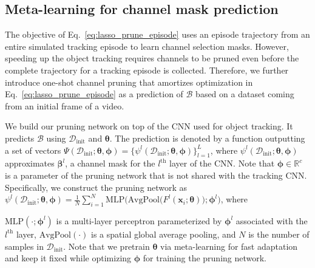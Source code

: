 \documentclass[letterpaper]{article} %
\def \x{\mathbf{x}}
\def \datainit{\mathcal{D}_\text{init}}
\def \phigeneral{\boldsymbol{\phi}}
\def \thetageneral{\boldsymbol{\theta}}
\begin{document}
\subsection{Meta-learning for channel mask prediction}

The objective of Eq.~\eqref{eq:lasso_prune_episode} uses an episode trajectory from an entire simulated tracking episode to learn channel selection masks.
However, speeding up the object tracking requires channels to be pruned even before the complete trajectory for a tracking episode is collected.
Therefore, we further introduce one-shot channel pruning that amortizes optimization in Eq.~\eqref{eq:lasso_prune_episode} as a prediction of $\mathcal{B}$ based on a dataset coming from an initial frame of a video.


We build our pruning network on top of the CNN used for object tracking.
It predicts $\mathcal{B}$ using $\datainit$ and $\thetageneral$.
The prediction is denoted by a function outputting a set of vectors $\Psi(\datainit; \thetageneral, \phigeneral) = \{\psi^l(\datainit; \thetageneral,\phigeneral)\}_{l=1}^{L}$, where $\psi^l(\datainit; \thetageneral, \phigeneral)$ approximates $\boldsymbol{\beta}^l$, a channel mask for the $l^\text{th}$ layer of the CNN.
Note that $\phigeneral \in \mathbb{R}^c$ is a parameter of the pruning network that is not shared with the tracking CNN.
Specifically, we construct the pruning network as $\psi^l(\datainit; \thetageneral, \phigeneral) = \frac{1}{N}\sum_{i=1}^{N} \text{MLP}\big(\text{AvgPool}\big(F^l(\x_i; \boldsymbol{\theta})\big);\phigeneral^l\big)$, where

$\text{MLP}(\cdot;\phigeneral^l)$ is a multi-layer perceptron parameterized by $\phigeneral^l$ associated with the $l^\text{th}$ layer, $\text{AvgPool}(\cdot)$ is a spatial global average pooling, and $N$ is the number of samples in $\datainit$.
Note that we pretrain $\boldsymbol{\theta}$ via meta-learning for fast adaptation and keep it fixed while optimizing $\phigeneral$ for training the pruning network.
\end{document}
